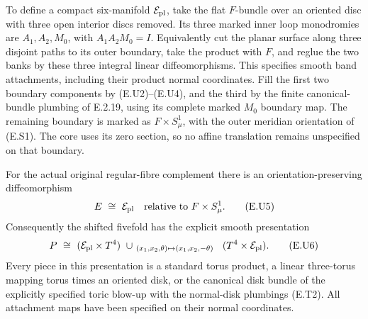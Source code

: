 To define a compact six-manifold $\mathcal E_{\rm pl}$, take the
flat $F$-bundle over an oriented disc with three open interior
discs removed.  Its three marked inner loop monodromies are
$A_1,A_2,M_0$, with $A_1A_2M_0=I$.  Equivalently cut the planar
surface along three disjoint paths to its outer boundary, take
the product with $F$, and reglue the two banks by these three
integral linear diffeomorphisms.  This specifies smooth band
attachments, including their product normal coordinates.
Fill the first two boundary components by (E.U2)--(E.U4), and
the third by the finite canonical-bundle plumbing of E.2.19,
using its complete marked $M_0$ boundary map.  The remaining
boundary is marked as $F\times S^1_\mu$, with the outer meridian
orientation of (E.S1).  The core uses its zero section, so no
affine translation remains unspecified on that boundary.

For the actual original regular-fibre complement there is an
orientation-preserving diffeomorphism
\[
                  E\ \cong\ \mathcal E_{\rm pl}
                 \quad\hbox{relative to }F\times S^1_\mu .
 \tag{E.U5}
\]
Consequently the shifted fivefold has the explicit smooth
presentation
\[
 P\ \cong\
 (\mathcal E_{\rm pl}\times T^4)
 \ \cup_{\ (x_1,x_2,\theta)\mapsto(x_1,x_2,-\theta)\ }\
 (T^4\times\mathcal E_{\rm pl}).
 \tag{E.U6}
\]
Every piece in this presentation is a standard torus product,
a linear three-torus mapping torus times an oriented disk, or
the canonical disk bundle of the explicitly specified toric
blow-up with the normal-disk plumbings (E.T2).  All attachment
maps have been specified on their normal coordinates.

